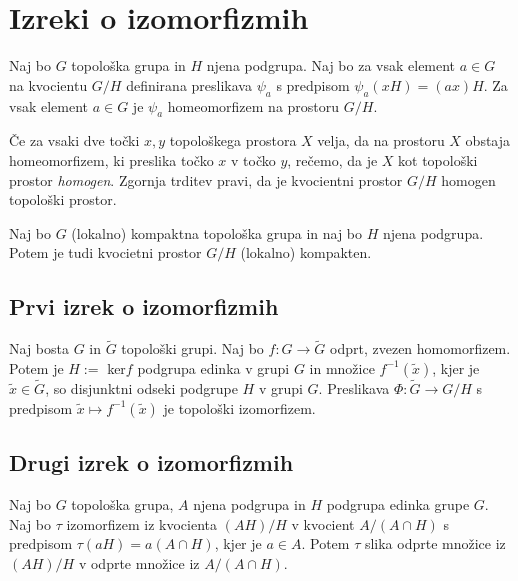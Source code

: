 \documentclass[mat1]{fmfdelo}
\begin{document}
\section{Izreki o izomorfizmih}

\begin{trditev}\label{trd:homogenkvoc}
	Naj bo $G$ topološka grupa in $H$ njena podgrupa. Naj bo za vsak element $a \in G$ na kvocientu $G/H$ definirana preslikava $\psi_a$ s predpisom $\psi_a(xH) = (ax)H$.
	Za vsak element $a \in G$ je $\psi_a$ homeomorfizem na prostoru $G/H$.
\end{trditev}

\begin{opomba}\label{opo:homogenkvoc}
	Če za vsaki dve točki $x, y$ topološkega prostora $X$ velja, da na prostoru $X$ obstaja homeomorfizem, ki preslika točko $x$ v točko $y$, rečemo, da je $X$ kot topološki prostor \emph{homogen}. Zgornja trditev pravi, da je kvocientni prostor $G/H$ homogen topološki prostor.
\end{opomba}

\begin{trditev}\label{trd:kvockompakt}
	Naj bo $G$ (lokalno) kompaktna topološka grupa in naj bo $H$ njena podgrupa. Potem je tudi kvocietni prostor $G/H$ (lokalno) kompakten.
\end{trditev}

\subsection{Prvi izrek o izomorfizmih}
\begin{izrek}\label{izr:prvitopizrek}
Naj bosta $G$ in $\widetilde{G}$ topološki grupi. Naj bo $f: G \to \widetilde{G}$ odprt, zvezen homomorfizem. Potem je $H :=$ ker$f$ podgrupa edinka v grupi $G$ in množice $f^{-1}(\tilde{x})$, kjer je $\tilde{x} \in \widetilde{G}$, so disjunktni odseki podgrupe $H$ v grupi $G$. Preslikava $\Phi:\widetilde{G} \to G/H$ s predpisom $\tilde{x} \mapsto f^{-1}(\tilde{x})$ je topološki izomorfizem.
\end{izrek}

\subsection{Drugi izrek o izomorfizmih}
\begin{izrek}\label{izr:preddrugi}
Naj bo $G$ topološka grupa, $A$ njena podgrupa in $H$ podgrupa edinka grupe $G$. Naj bo $\tau$ izomorfizem iz kvocienta $(AH)/H$ v kvocient $A/(A \cap H)$ s predpisom $\tau (aH) = a(A \cap H)$, kjer je $a \in A$. Potem $\tau$ slika odprte množice iz $(AH)/H$ v odprte množice iz $A/(A \cap H)$.
\end{izrek}
\end{document}
